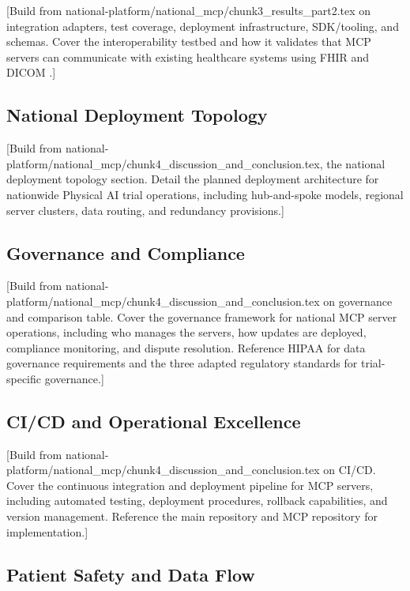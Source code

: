 [Build from national-platform/national\_mcp/chunk3\_results\_part2.tex on
integration adapters, test coverage, deployment infrastructure, SDK/tooling,
and schemas. Cover the interoperability testbed and how it validates that
MCP servers can communicate with existing healthcare systems using FHIR
\cite{hl7-fhir} and DICOM \cite{dicom}.]

\subsection{National Deployment Topology}
\label{subsec:mcp-deployment}

[Build from national-platform/national\_mcp/chunk4\_discussion\_and\_conclusion.tex,
the national deployment topology section. Detail the planned deployment
architecture for nationwide Physical AI trial operations, including hub-and-spoke
models, regional server clusters, data routing, and redundancy provisions.]

\subsection{Governance and Compliance}
\label{subsec:mcp-governance}

[Build from national-platform/national\_mcp/chunk4\_discussion\_and\_conclusion.tex
on governance and comparison table. Cover the governance framework for national
MCP server operations, including who manages the servers, how updates are
deployed, compliance monitoring, and dispute resolution. Reference HIPAA
\cite{hipaa} for data governance requirements and the three adapted regulatory
standards for trial-specific governance.]

\subsection{CI/CD and Operational Excellence}
\label{subsec:mcp-cicd}

[Build from national-platform/national\_mcp/chunk4\_discussion\_and\_conclusion.tex
on CI/CD. Cover the continuous integration and deployment pipeline for MCP
servers, including automated testing, deployment procedures, rollback
capabilities, and version management. Reference the main repository
\cite{main-repo} and MCP repository \cite{mcp-repo} for implementation.]

\subsection{Patient Safety and Data Flow}
\label{subsec:mcp-patient-safety}

